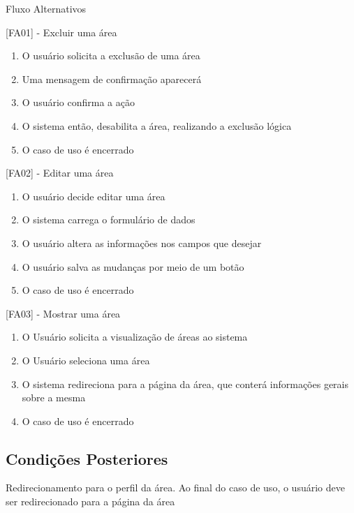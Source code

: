 Fluxo Alternativos

[FA01] - Excluir uma área
\begin{enumerate}
  \item{O usuário solicita a exclusão de uma área}
  \item{Uma mensagem de confirmação aparecerá}
  \item{O usuário confirma a ação}
  \item{O sistema então, desabilita a área, realizando a exclusão lógica}
  \item{O caso de uso é encerrado}
\end{enumerate}


[FA02] - Editar uma área
\begin{enumerate}
  \item{O usuário decide editar uma área}
  \item{O sistema carrega o formulário de dados}
  \item{O usuário altera as informações nos campos que desejar}
  \item{O usuário salva as mudanças por meio de um botão}
  \item{O caso de uso é encerrado}
\end{enumerate}


[FA03] - Mostrar uma área
\begin{enumerate}
  \item{O Usuário solicita a visualização de áreas ao sistema}
  \item{O Usuário seleciona uma área}
  \item{O sistema redireciona para a página da área, que conterá informações gerais sobre a mesma}
  \item{O caso de uso é encerrado}
\end{enumerate}


\subsection{Condições Posteriores}

Redirecionamento para o perfil da área. Ao final do caso de uso, o usuário deve ser redirecionado para a página da área


